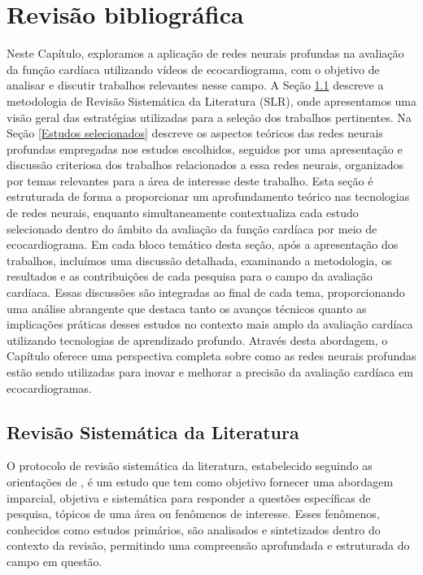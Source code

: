 \chapter{Revisão bibliográfica}
\label{Revisão bibliográfica}

Neste Capítulo, exploramos a aplicação de redes neurais profundas na avaliação da função cardíaca utilizando vídeos de ecocardiograma, com o objetivo de analisar e discutir trabalhos relevantes nesse campo.  A Seção \ref{Revisão Sistemática da Literatura} descreve a metodologia de Revisão Sistemática da Literatura (SLR), onde apresentamos uma visão geral das estratégias utilizadas para a seleção dos trabalhos pertinentes. Na Seção \ref{Estudos selecionados} descreve os aspectos teóricos das redes neurais profundas empregadas nos estudos escolhidos, seguidos por uma apresentação e discussão criteriosa dos trabalhos relacionados a essa redes neurais, organizados por temas relevantes para a área de interesse deste trabalho. Esta seção é estruturada de forma a proporcionar um aprofundamento teórico nas tecnologias de redes neurais, enquanto simultaneamente contextualiza cada estudo selecionado dentro do âmbito da avaliação da função cardíaca por meio de ecocardiograma.
 Em cada bloco temático desta seção, após a apresentação dos trabalhos, incluímos uma discussão detalhada, examinando a metodologia, os resultados e as contribuições de cada pesquisa para o campo da avaliação cardíaca. Essas discussões são integradas ao final de cada tema, proporcionando uma análise abrangente que destaca tanto os avanços técnicos quanto as implicações práticas desses estudos no contexto mais amplo da avaliação cardíaca utilizando tecnologias de aprendizado profundo. Através desta abordagem, o Capítulo oferece uma perspectiva completa sobre como as redes neurais profundas estão sendo utilizadas para inovar e melhorar a precisão da avaliação cardíaca em ecocardiogramas.

\section{Revisão Sistemática da Literatura}
\label{Revisão Sistemática da Literatura}

O protocolo de revisão sistemática da literatura, estabelecido seguindo as orientações de \cite{kitchenham2009systematic}, é um estudo que tem como objetivo fornecer uma abordagem imparcial, objetiva e sistemática para responder a questões específicas de pesquisa, tópicos de uma área ou fenômenos de interesse. Esses fenômenos, conhecidos como estudos primários, são analisados e sintetizados dentro do contexto da revisão, permitindo uma compreensão aprofundada e estruturada do campo em questão.

